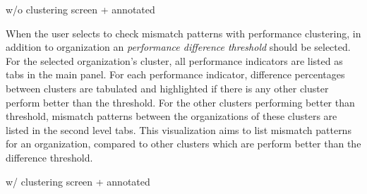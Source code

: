 w/o clustering screen + annotated

When the user selects to check mismatch patterns with performance clustering, in addition to organization an \textit{performance difference threshold} should be selected. For the selected organization's cluster, all performance indicators are listed as tabs in the main panel. For each performance indicator, difference percentages between clusters are tabulated and highlighted if there is any other cluster perform better than the threshold. For the other clusters performing better than threshold, mismatch patterns between the organizations of these clusters are listed in the second level tabs. This visualization aims to list mismatch patterns for an organization, compared to other clusters which are perform better than the difference threshold.

w/ clustering screen + annotated